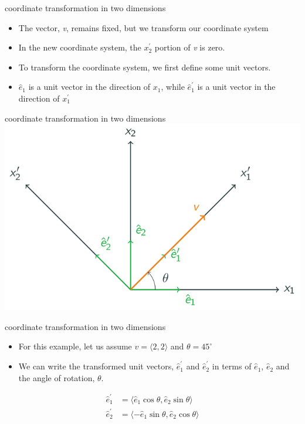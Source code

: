 \documentclass[
  letterpaper,
  ignorenonframetext,
  aspectratio=43,
  handout,
  12pt]{beamer}
\providecommand{\tightlist}{%
  \setlength{\itemsep}{0pt}\setlength{\parskip}{0pt}}
\providecommand{\tightlist}{%
\setlength{\itemsep}{0pt}\setlength{\parskip}{0pt}}
\let\Oldincludegraphics\includegraphics
\renewcommand{\includegraphics}[2][]{\Oldincludegraphics[width=\textwidth,height=0.7\textheight,keepaspectratio]{#2}}
\begin{document}
\begin{frame}{coordinate transformation in two dimensions}
\protect\hypertarget{coordinate-transformation-in-two-dimensions-1}{}
\begin{itemize}
\tightlist
\item
  The vector, \emph{v}, remains fixed, but we transform our coordinate
  system
\item
  In the new coordinate system, the \(x_2^\prime\) portion of \emph{v}
  is zero.
\item
  To transform the coordinate system, we first define some unit vectors.
\item
  \(\hat{e}_1\) is a unit vector in the direction of \(x_1\), while
  \(\hat{e}_1^\prime\) is a unit vector in the direction of
  \(x_1^\prime\)
\end{itemize}
\end{frame}

\begin{frame}{coordinate transformation in two dimensions}
\protect\hypertarget{coordinate-transformation-in-two-dimensions-2}{}
\includegraphics{../images/trans-vec-unit.svg}
\end{frame}

\begin{frame}{coordinate transformation in two dimensions}
\protect\hypertarget{coordinate-transformation-in-two-dimensions-3}{}
\begin{itemize}
\tightlist
\item
  For this example, let us assume \(v = \langle 2, 2 \rangle\) and
  \(\theta = 45^\circ\)
\item
  We can write the transformed unit vectors, \(\hat{e}_1^\prime\) and
  \(\hat{e}_2^\prime\) in terms of \(\hat{e}_1\), \(\hat{e}_2\) and the
  angle of rotation, \(\theta\).
\end{itemize}

\[\begin{aligned}
    \hat{e}_1^\prime &= \langle \hat{e}_1 \cos \theta , \hat{e}_2 \sin \theta \rangle\\
    \hat{e}_2^\prime &= \langle -\hat{e}_1 \sin \theta , \hat{e}_2 \cos \theta \rangle
\end{aligned}\]
\end{frame}
\end{document}
